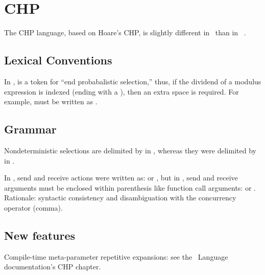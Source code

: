 
\section{CHP}
\label{sec:chp}

The CHP language, based on Hoare's CHP, 
 is slightly different in \hac\ than in \CAST~\cite{ref:csp}.  

\subsection{Lexical Conventions}
\label{sec:chp:lex}

In \hac, \ttt{\chpendprobsel} is a token for ``end probabalistic selection,''
thus, if the dividend of a modulus expression is indexed
(ending with a \rbracket), then an extra space is required.
For example,  must be written as
.

\subsection{Grammar}
\label{sec:chp:grammar}

Nondeterministic selections are delimited by \ttt{:} in \hac, 
whereas they were delimited by \ttt{|} in \CAST.  


In \CAST, send and receive actions were written as:
 or , but in \hac, send and receive arguments must be
enclosed within parenthesis like function call arguments:
 or .  
Rationale: syntactic consistency and disambiguation with the 
concurrency operator (comma).  


\subsection{New features}
\label{sec:chp:new}

Compile-time meta-parameter repetitive expansions:
see the \hac\ Language documentation's CHP chapter.  

